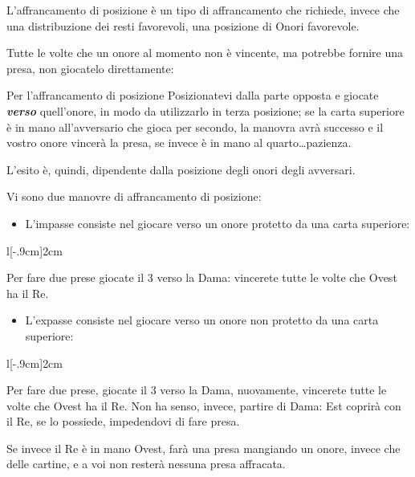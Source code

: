\documentclass[../corsofiori.tex]{subfiles}
\begin{document}
L'affrancamento di posizione è un tipo di affrancamento che richiede, invece che una distribuzione dei resti favorevoli,
una posizione di Onori favorevole.

Tutte le volte che un onore al momento non è vincente, ma potrebbe fornire una presa, non giocatelo direttamente:

\begin{regola}{Per l'affrancamento di posizione}
 Posizionatevi dalla parte opposta e giocate \emph{\textbf{verso}} quell'onore, in modo da utilizzarlo in terza
posizione; se la carta superiore è in mano all'avversario che gioca per secondo, la manovra avrà successo e il vostro
onore vincerà la presa, se invece è in mano al quarto\ldots pazienza.
\end{regola}

L'esito è, quindi, dipendente dalla posizione degli onori degli avversari.

Vi sono due manovre di affrancamento di posizione:

\begin{itemize}
    \item L'impasse consiste nel giocare verso un onore protetto da una carta superiore:
\end{itemize}

\begin{wraptable}[2]{l}[-.9cm]{2cm}
    \vspace{-1.0cm}
\end{wraptable}

        Per fare due prese giocate il 3 verso la Dama: vincerete tutte le volte che Ovest ha il Re.

\begin{itemize}
    \item L'expasse consiste nel giocare verso un onore non protetto da una carta superiore:
\end{itemize}

\begin{wraptable}[4]{l}[-.9cm]{2cm}
    \vspace{-1.0cm}
\end{wraptable}

Per fare due prese, giocate il 3 verso la Dama, nuovamente, vincerete tutte le volte che Ovest ha il Re. Non ha senso,
invece, partire di Dama: Est coprirà con il Re, se lo possiede, impedendovi di fare presa.

Se invece il Re è in mano Ovest, farà una presa
mangiando un onore, invece che delle cartine, e a voi non resterà nessuna presa affracata.
\end{document}
